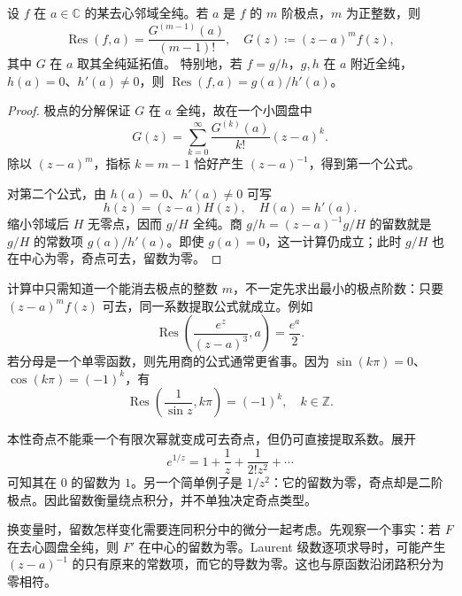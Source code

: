 \begin{proposition}\label{b3:prop:03-residue-formulas}
设 \(f\) 在 \(a\in\mathbb C\) 的某去心邻域全纯。若 \(a\) 是 \(f\) 的 \(m\) 阶极点，\(m\) 为正整数，则
\[
 \operatorname{Res}(f,a)=\frac{G^{(m-1)}(a)}{(m-1)!},
 \quad G(z)\coloneqq(z-a)^mf(z),
\]
其中 \(G\) 在 \(a\) 取其全纯延拓值。
特别地，若 \(f=g/h\)，\(g,h\) 在 \(a\) 附近全纯，\(h(a)=0\)、\(h'(a)\ne0\)，则 \(\operatorname{Res}(f,a)=g(a)/h'(a)\)。
\end{proposition}
\begin{proof}
极点的分解保证 \(G\) 在 \(a\) 全纯，故在一个小圆盘中
\[
 G(z)=\sum_{k=0}^{\infty}\frac{G^{(k)}(a)}{k!}(z-a)^k.
\]
除以 \((z-a)^m\)，指标 \(k=m-1\) 恰好产生 \((z-a)^{-1}\)，得到第一个公式。

对第二个公式，由 \(h(a)=0\)、\(h'(a)\ne0\) 可写
\[
 h(z)=(z-a)H(z),\quad H(a)=h'(a).
\]
缩小邻域后 \(H\) 无零点，因而 \(g/H\) 全纯。商 \(g/h=(z-a)^{-1}g/H\) 的留数就是 \(g/H\) 的常数项 \(g(a)/h'(a)\)。即使 \(g(a)=0\)，这一计算仍成立；此时 \(g/H\) 也在中心为零，奇点可去，留数为零。
\end{proof}
计算中只需知道一个能消去极点的整数 \(m\)，不一定先求出最小的极点阶数：只要 \((z-a)^mf(z)\) 可去，同一系数提取公式就成立。例如
\[
 \operatorname{Res}\left(\frac{e^z}{(z-a)^3},a\right)=\frac{e^a}{2}.
\]
若分母是一个单零函数，则先用商的公式通常更省事。因为 \(\sin(k\pi)=0\)、\(\cos(k\pi)=(-1)^k\)，有
\[
 \operatorname{Res}\left(\frac1{\sin z},k\pi\right)=(-1)^k,
 \quad k\in\mathbb Z.
\]

\ProseParagraphBreak

本性奇点不能乘一个有限次幂就变成可去奇点，但仍可直接提取系数。展开
\[
 e^{1/z}=1+\frac1z+\frac1{2!z^2}+\cdots
\]
可知其在 \(0\) 的留数为 \(1\)。另一个简单例子是 \(1/z^2\)：它的留数为零，奇点却是二阶极点。因此留数衡量绕点积分，并不单独决定奇点类型。

\ProseParagraphBreak

换变量时，留数怎样变化需要连同积分中的微分一起考虑。先观察一个事实：若 \(F\) 在去心圆盘全纯，则 \(F'\) 在中心的留数为零。Laurent 级数逐项求导时，可能产生 \((z-a)^{-1}\) 的只有原来的常数项，而它的导数为零。这也与原函数沿闭路积分为零相符。

